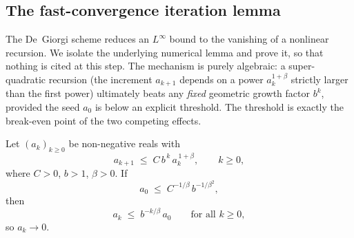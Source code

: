 \subsection{The fast-convergence iteration lemma}\label{ssec:DG-lemma}

The De~Giorgi scheme reduces an $L^\infty$ bound to the vanishing of a
nonlinear recursion. We isolate the underlying numerical lemma and prove
it, so that nothing is cited at this step. The mechanism is purely
algebraic: a super-quadratic recursion (the increment $a_{k+1}$ depends
on a power $a_k^{1+\beta}$ strictly larger than the first power)
ultimately beats any \emph{fixed} geometric growth factor $b^k$, provided
the seed $a_0$ is below an explicit threshold. The threshold is exactly
the break-even point of the two competing effects.

\begin{lemma}\label{lem:DG-iteration2}
Let $(a_k)_{k\ge0}$ be non-negative reals with
\begin{equation}\label{eq:DG-recursion2}
   a_{k+1}\;\le\;C\,b^{\,k}\,a_k^{\,1+\beta},\qquad k\ge0,
\end{equation}
where $C>0$, $b>1$, $\beta>0$. If
\begin{equation}\label{eq:DG-smallness2}
   a_0\;\le\;C^{-1/\beta}\,b^{-1/\beta^2},
\end{equation}
then
\begin{equation}\label{eq:DG-conclusion}
   a_k\;\le\;b^{-k/\beta}\,a_0\qquad\text{for all }k\ge0,
\end{equation}
so $a_k\to0$.
\end{lemma}


